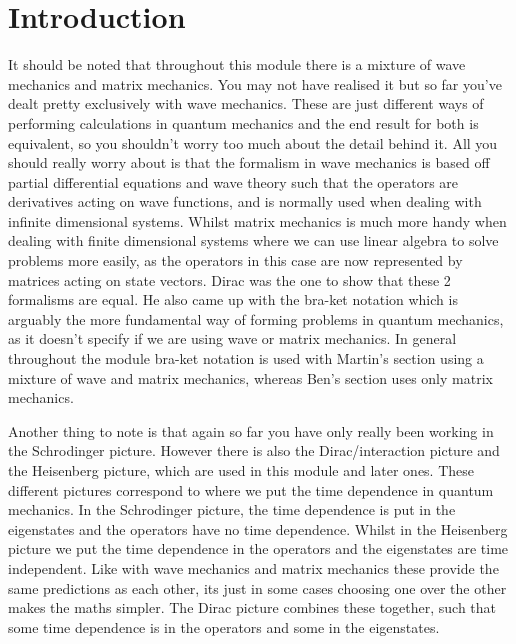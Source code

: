 \documentclass[
10pt, %
oneside, %
english, %
onehalfspacing, %
]{McMasterThesis} %
\begin{document}
\section*{\Huge Introduction} 
It should be noted that throughout this module there is a mixture of wave mechanics and matrix mechanics. You may not have realised it but so far you've dealt pretty exclusively with wave mechanics. These are just different ways of performing calculations in quantum mechanics and the end result for both is equivalent, so you shouldn't worry too much about the detail behind it. All you should really worry about is that the formalism in wave mechanics is based off partial differential equations and wave theory such that the operators are derivatives acting on wave functions, and is normally used when dealing with infinite dimensional systems. Whilst matrix mechanics is much more handy when dealing with finite dimensional systems where we can use linear algebra to solve problems more easily, as the operators in this case are now represented by matrices acting on state vectors. Dirac was the one to show that these 2 formalisms are equal. He also came up with the bra-ket notation which is arguably the more fundamental way of forming problems in quantum mechanics, as it doesn't specify if we are using wave or matrix mechanics. In general throughout the module bra-ket notation is used with Martin's section using a mixture of wave and matrix mechanics, whereas Ben's section uses only matrix mechanics.

\noindent Another thing to note is that again so far you have only really been working in the Schrodinger picture. However there is also the Dirac/interaction picture and the Heisenberg picture, which are used in this module and later ones. These different pictures correspond to where we put the time dependence in quantum mechanics. In the Schrodinger picture, the time dependence is put in the eigenstates and the operators have no time dependence. Whilst in the Heisenberg picture we put the time dependence in the operators and the eigenstates are time independent. Like with wave mechanics and matrix mechanics these provide the same predictions as each other, its just in some cases choosing one over the other makes the maths simpler. The Dirac picture combines these together, such that some time dependence is in the operators and some in the eigenstates.
\end{document}
